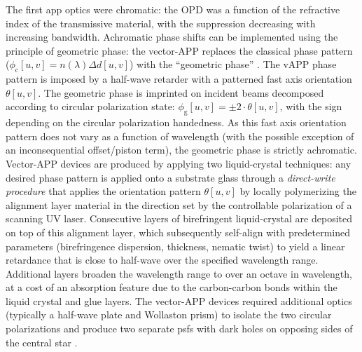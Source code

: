 \documentclass[letterpaper]{ar-1col}
\begin{document}
The first \ac{app} optics were chromatic: the OPD was a function of the refractive index of the transmissive material, with the suppression decreasing with increasing bandwidth.
%
Achromatic phase shifts can be implemented using the principle of geometric phase: the vector-APP \citep[vAPP; ][]{Snik12} replaces the classical phase pattern ($\phi_{\textrm{c}}[u,v] =
n(\lambda) \Delta d[u,v]$) with the ``geometric phase'' \citep[known as the Pancharatnam-Berry phase; ][]{Pancharatnam,Berry}.
%
The vAPP phase pattern is imposed by a half-wave retarder with a patterned fast axis orientation $\theta[u,v]$.
%
The geometric phase is imprinted on incident beams decomposed according to circular polarization state: $\phi_{\textrm{g}}[u,v] = \pm2\cdot\theta[u,v]$, with the sign depending on the circular polarization handedness.
As this fast axis orientation pattern does not vary as a function of wavelength (with the possible exception of an inconsequential offset/piston term), the geometric phase is strictly achromatic.
%
%
Vector-APP devices are produced by applying two liquid-crystal techniques: any desired phase pattern is applied onto a substrate glass through a \textit{direct-write procedure} \citep{directwrite} that applies the orientation pattern $\theta[u,v]$ by locally polymerizing the alignment layer material in the direction set by the controllable polarization of a scanning UV laser.
%
Consecutive layers of birefringent liquid-crystal are deposited on top of this alignment layer, which subsequently self-align \citep[``\textit{Multi-Twist Retarders}''; MTR ][]{MTR} with predetermined parameters (birefringence dispersion, thickness, nematic twist) to yield a linear retardance that is close to half-wave over the specified wavelength range.
%
Additional layers broaden the wavelength range to over an octave in wavelength, at a cost of an absorption feature due to the carbon-carbon bonds within the liquid crystal and glue layers.
%
The vector-APP devices required additional optics (typically a half-wave plate and Wollaston prism) to isolate the two circular polarizations and produce two separate \acp{psf} with dark holes on opposing sides of the central star \citep{Snik12}.
\end{document}
